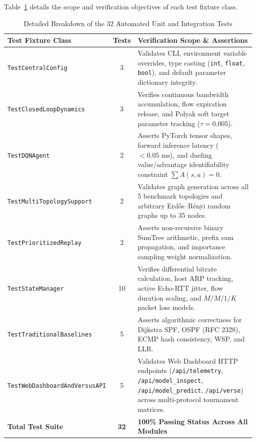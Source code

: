 \documentclass[12pt,a4paper,oneside]{report}
\begin{document}
Table~\ref{tab:test_cases_breakdown} details the scope and verification objectives of each test fixture class.

\begin{table}[htbp]
\centering
\caption{Detailed Breakdown of the 32 Automated Unit and Integration Tests}
\label{tab:test_cases_breakdown}
\small
\begin{tabularx}{\textwidth}{l c X}
\toprule
\textbf{Test Fixture Class} & \textbf{Tests} & \textbf{Verification Scope \& Assertions} \\
\midrule
\texttt{TestCentralConfig} & 3 & Validates CLI, environment variable overrides, type casting (\texttt{int}, \texttt{float}, \texttt{bool}), and default parameter dictionary integrity. \\
\addlinespace
\texttt{TestClosedLoopDynamics} & 3 & Verifies continuous bandwidth accumulation, flow expiration release, and Polyak soft target parameter tracking ($\tau = 0.005$). \\
\addlinespace
\texttt{TestDQNAgent} & 2 & Asserts PyTorch tensor shapes, forward inference latency ($<0.05\text{ ms}$), and dueling value/advantage identifiability constraint $\sum A(s, a) = 0$. \\
\addlinespace
\texttt{TestMultiTopologySupport} & 2 & Validates graph generation across all 5 benchmark topologies and arbitrary Erd\H{o}s--R\'enyi random graphs up to 35 nodes. \\
\addlinespace
\texttt{TestPrioritizedReplay} & 2 & Asserts non-recursive binary SumTree arithmetic, prefix sum propagation, and importance sampling weight normalization. \\
\addlinespace
\texttt{TestStateManager} & 10 & Verifies differential bitrate calculation, host ARP tracking, active Echo-RTT jitter, flow duration scaling, and $M/M/1/K$ packet loss models. \\
\addlinespace
\texttt{TestTraditionalBaselines} & 5 & Asserts algorithmic correctness for Dijkstra SPF, OSPF (RFC 2328), ECMP hash consistency, WSP, and LLR. \\
\addlinespace
\texttt{TestWebDashboardAndVersusAPI} & 5 & Validates Web Dashboard HTTP endpoints (\texttt{/api/telemetry}, \texttt{/api/model\_inspect}, \texttt{/api/model\_predict}, \texttt{/api/verse}) across multi-protocol tournament matrices. \\
\midrule
\textbf{Total Test Suite} & \textbf{32} & \textbf{100\% Passing Status Across All Modules} \\
\bottomrule
\end{tabularx}
\end{table}
\end{document}
